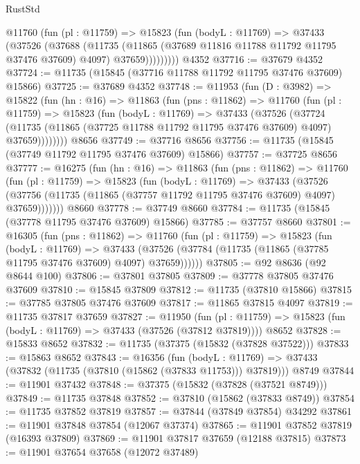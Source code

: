\begin{lexlean}{RustStd}
\begin{coremodule}
          @11760
            (fun (pl : @11759) =>
            @15823
              (fun (bodyL : @11769) =>
              @37433
                (@37526
                  (@37688
                    (@11735
                      (@11865 (@37689 @11816 @11788 @11792 @11795 @37476 @37609) @4097)
                      @37659)))))))))
    @4352
@37716 := @37679 @4352
@37724 := @11735 (@15845 (@37716 @11788 @11792 @11795 @37476 @37609) @15866)
@37725 := @37689 @4352
@37748 := @11953
    (fun (D : @3982) =>
    @15822
      (fun (hn : @16) =>
      @11863
        (fun (pns : @11862) =>
        @11760
          (fun (pl : @11759) =>
          @15823
            (fun (bodyL : @11769) =>
            @37433
              (@37526
                (@37724
                  (@11735 (@11865 (@37725 @11788 @11792 @11795 @37476 @37609) @4097) @37659))))))))
    @8656
@37749 := @37716 @8656
@37756 := @11735 (@15845 (@37749 @11792 @11795 @37476 @37609) @15866)
@37757 := @37725 @8656
@37777 := @16275
    (fun (hn : @16) =>
    @11863
      (fun (pns : @11862) =>
      @11760
        (fun (pl : @11759) =>
        @15823
          (fun (bodyL : @11769) =>
          @37433
            (@37526
              (@37756 (@11735 (@11865 (@37757 @11792 @11795 @37476 @37609) @4097) @37659)))))))
    @8660
@37778 := @37749 @8660
@37784 := @11735 (@15845 (@37778 @11795 @37476 @37609) @15866)
@37785 := @37757 @8660
@37801 := @16305
    (fun (pns : @11862) =>
    @11760
      (fun (pl : @11759) =>
      @15823
        (fun (bodyL : @11769) =>
        @37433 (@37526 (@37784 (@11735 (@11865 (@37785 @11795 @37476 @37609) @4097) @37659))))))
@37805 := @92 @8636 (@92 @8644 @100)
@37806 := @37801 @37805
@37809 := @37778 @37805 @37476 @37609
@37810 := @15845 @37809
@37812 := @11735 (@37810 @15866)
@37815 := @37785 @37805 @37476 @37609
@37817 := @11865 @37815 @4097
@37819 := @11735 @37817 @37659
@37827 := @11950
    (fun (pl : @11759) => @15823 (fun (bodyL : @11769) => @37433 (@37526 (@37812 @37819))))
    @8652
@37828 := @15833 @8652
@37832 := @11735 (@37375 (@15832 (@37828 @37522)))
@37833 := @15863 @8652
@37843 := @16356
    (fun (bodyL : @11769) => @37433 (@37832 (@11735 (@37810 (@15862 (@37833 @11753))) @37819)))
    @8749
@37844 := @11901 @37432
@37848 := @37375 (@15832 (@37828 (@37521 @8749)))
@37849 := @11735 @37848
@37852 := @37810 (@15862 (@37833 @8749))
@37854 := @11735 @37852 @37819
@37857 := @37844 (@37849 @37854) @34292
@37861 := @11901 @37848 @37854 (@12067 @37374)
@37865 := @11901 @37852 @37819 (@16393 @37809)
@37869 := @11901 @37817 @37659 (@12188 @37815)
@37873 := @11901 @37654 @37658 (@12072 @37489)

\end{coremodule}
\end{lexlean}

